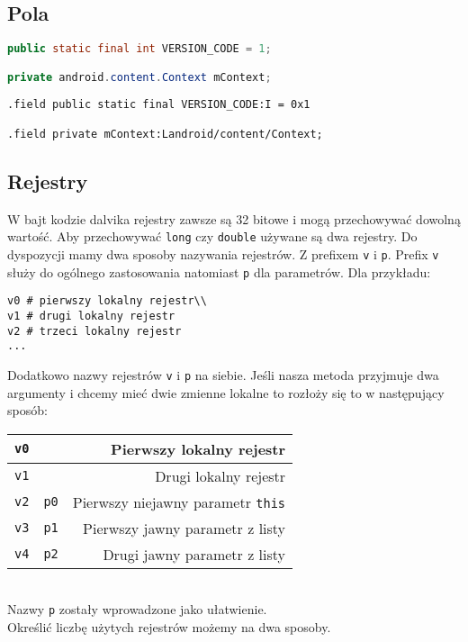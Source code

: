 \documentclass[12pt,a4paper,leqno,oneside,titlepage]{book}
\begin{document}
\subsection{Pola}
%
\begin{lstlisting}[language=Java,captionpos=b,caption={Java}]
public static final int VERSION_CODE = 1;

private android.content.Context mContext;
\end{lstlisting}
\begin{lstlisting}[language=smali,captionpos=b,caption={Smali}]
.field public static final VERSION_CODE:I = 0x1

.field private mContext:Landroid/content/Context;
\end{lstlisting}
%
\subsection{Rejestry}
%
W bajt kodzie dalvika rejestry zawsze są 32 bitowe\cite{SmaliWiki} i mogą przechowywać dowolną wartość. Aby przechowywać \verb|long| czy \verb|double| używane są dwa rejestry.
Do dyspozycji mamy dwa sposoby nazywania rejestrów.
Z prefixem \verb|v| i \verb|p|. Prefix \verb|v| służy do ogólnego zastosowania natomiast \verb|p| dla parametrów.
Dla przykładu:
%
\begin{lstlisting}[language=smali,captionpos=b,caption={}]
v0 # pierwszy lokalny rejestr\\
v1 # drugi lokalny rejestr
v2 # trzeci lokalny rejestr
...
\end{lstlisting}
%
Dodatkowo nazwy rejestrów \verb|v| i \verb|p|  na siebie.
Jeśli nasza metoda przyjmuje dwa argumenty i chcemy mieć dwie zmienne lokalne to rozłoży się to w następujący sposób:\\
\begin{tabular}{|l | c | r |}
\hline 
\verb|v0| & & Pierwszy lokalny rejestr\\
\hline
\verb|v1| & & Drugi lokalny rejestr\\
\hline
\verb|v2| & \verb|p0| & Pierwszy niejawny parametr \verb|this|\\
\hline
\verb|v3| & \verb|p1| & Pierwszy jawny parametr z listy\\
\hline
\verb|v4| & \verb|p2| & Drugi jawny parametr z listy\\
\hline
\end{tabular} \\
%
Nazwy \verb|p| zostały wprowadzone jako ułatwienie.\\
Określić liczbę użytych rejestrów możemy na dwa sposoby. \\
\end{document}

